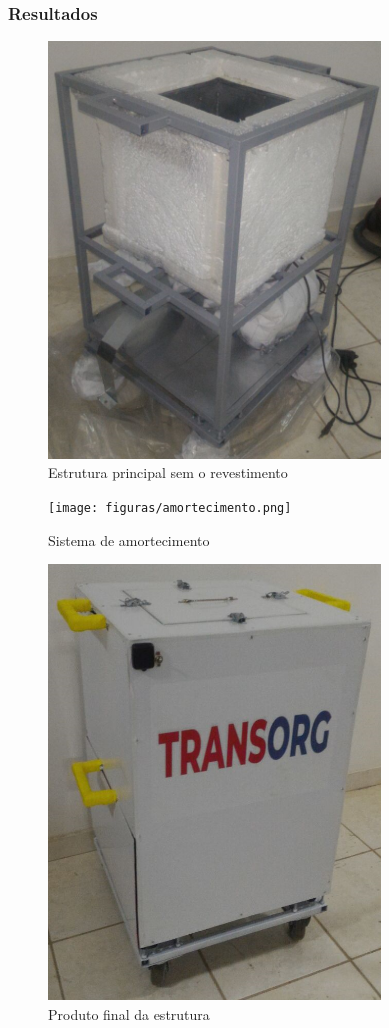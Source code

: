 \subsubsection{Resultados}

\begin{figure}[H]
	\centering
	\includegraphics[width=250pt]{figuras/estrutura_fab.png}
	\caption{Estrutura principal sem o revestimento}
\end{figure}

\begin{figure}[H]
	\centering
	\texttt{[image: figuras/amortecimento.png]}
	\caption{Sistema de amortecimento}
\end{figure}

\begin{figure}[H]
	\centering
	\includegraphics[width=250pt]{figuras/estrutura_final.png}
	\caption{Produto final da estrutura}
\end{figure}


